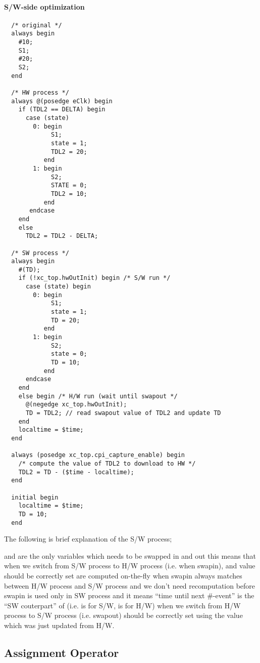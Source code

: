 \documentclass{note}
\begin{document}
\paragraph{S/W-side optimization}
\begin{verbatim}
  /* original */
  always begin
    #10;
    S1;
    #20;
    S2;
  end

  /* HW process */
  always @(posedge eClk) begin
    if (TDL2 == DELTA) begin
      case (state)
        0: begin
             S1;
             state = 1;
             TDL2 = 20;
           end
        1: begin
             S2;
             STATE = 0;
             TDL2 = 10;
           end
       endcase
    end
    else
      TDL2 = TDL2 - DELTA;

  /* SW process */
  always begin
    #(TD);
    if (!xc_top.hwOutInit) begin /* S/W run */
      case (state) begin
        0: begin
             S1;
             state = 1;
             TD = 20;
           end
        1: begin
             S2;
             state = 0;
             TD = 10;
           end
      endcase
    end
    else begin /* H/W run (wait until swapout */
      @(negedge xc_top.hwOutInit);
      TD = TDL2; // read swapout value of TDL2 and update TD 
    end
    localtime = $time;
  end

  always (posedge xc_top.cpi_capture_enable) begin  
    /* compute the value of TDL2 to download to HW */
    TDL2 = TD - ($time - localtime);
  end
 
  initial begin
    localtime = $time;
    TD = 10;
  end
\end{verbatim}
The following is brief explanation of the S/W process;
\bit
\item {} and  are the only variables which needs to be
  swapped in and out
  \bit
  \w this means that when we switch from S/W process to H/W process (i.e. when
  swapin),  and  value should be correctly set
  \w {} are computed on-the-fly when swapin
  \w {} always matches between H/W process and S/W process and we
  don't need recomputation before swapin
  \eit
\w {} is used only in SW process and it means ``time until next
\#-event''
  \bit
  \w {} is the ``SW couterpart'' of   (i.e.  is for S/W,
   is for H/W)
  \w when we switch from H/W process to S/W process (i.e. swapout) 
  should be correctly set using the  value which was just updated
  from H/W. 
  \eit
\eit

\subsection{Assignment Operator}
\end{document}
